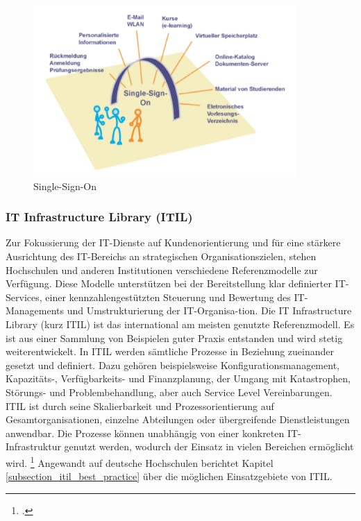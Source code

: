 \begin{figure}[h!]
	\centering
	\includegraphics[width=10cm]{kapitel/gruppe1_2/bilder/SSO}
	\caption{Single-Sign-On\protect\footnotemark}
	\label{fig_sso}
\end{figure}


\subsubsection{IT Infrastructure Library (ITIL)}
\label{subsubsection_ITIL}
Zur Fokussierung der IT-Dienste auf Kundenorientierung und für eine stärkere Ausrichtung des 
IT-Bereichs an strategischen Organisationszielen, stehen Hochschulen und anderen Institutionen 
verschiedene Referenzmodelle zur Verfügung. Diese Modelle unterstützen bei der Bereitstellung klar 
definierter IT-Services, einer kennzahlengestützten Steuerung und Bewertung des IT-Managements und 
Umstrukturierung der IT-Organisa-tion. Die IT Infrastructure Library (kurz ITIL) ist das international am 
meisten genutzte Referenzmodell. Es ist aus einer Sammlung von Beispielen guter Praxis entstanden 
und wird stetig weiterentwickelt. In ITIL werden sämtliche Prozesse in Beziehung zueinander gesetzt 
und definiert. Dazu gehören beispielsweise Konfigurationsmanagement, Kapazitäts-, Verfügbarkeits- 
und Finanzplanung, der Umgang mit Katastrophen, Störungs- und Problembehandlung, aber auch 
Service Level Vereinbarungen. ITIL ist durch seine Skalierbarkeit und Prozessorientierung auf 
Gesamtorganisationen, einzelne Abteilungen oder übergreifende Dienstleistungen anwendbar. Die 
Prozesse können unabhängig von einer konkreten IT-Infrastruktur genutzt werden, wodurch der 
Einsatz in vielen Bereichen ermöglicht wird. \footcite[Vgl.][34]{leitner_itil_2008}
Angewandt auf deutsche Hochschulen berichtet Kapitel \ref{subsection_itil_best_practice} über die möglichen Einsatzgebiete von ITIL.

